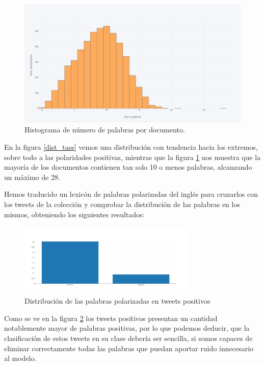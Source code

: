 \begin{figure}[!ht]
	\centering
	\includegraphics[width=1\textwidth]{imaxes/distTokensTass.png}
	\caption{Histograma de número de palabras por documento.}
	\label{dist_tokes_tass}
\end{figure}

En la figura \ref{dist_tass} vemos una distribución con tendencia hacia los extremos, sobre todo a las polaridades positivas, mientras que la figura \ref{dist_tokes_tass} nos muestra que la mayoría de los documentos contienen tan solo 10 o menos palabras, alcanzando un máximo de 28.

Hemos traducido un lexicón de palabras polarizadas del inglés para cruzarlos con los tweets de la colección y comprobar la distribución de las palabras en los mismos, obteniendo los siguientes resultados:

\begin{figure}[H]
	\centering
	\includegraphics[width=0.75\textwidth]{imaxes/dist_pos_neg.png}
	\caption{Distribución de las palabras polarizadas en tweets positivos}
	\label{dist_pos}
\end{figure}

Como se ve en la figura \ref{dist_pos} los tweets positivos presentan un cantidad notablemente mayor de palabras positivas, por lo que podemos deducir, que la clasificación de estos tweets en su clase debería ser sencilla, si somos capaces de eliminar correctamente todas las palabras que puedan aportar ruido innecesario al modelo.

